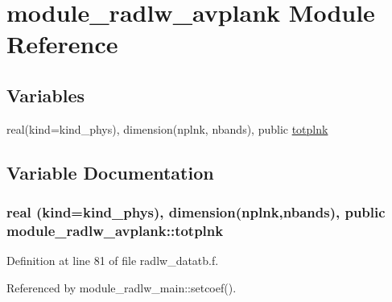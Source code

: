 \hypertarget{namespacemodule__radlw__avplank}{}\section{module\+\_\+radlw\+\_\+avplank Module Reference}
\label{namespacemodule__radlw__avplank}
\subsection*{Variables}
\begin{DoxyCompactItemize}
\item 
real(kind=kind\+\_\+phys), dimension(nplnk, nbands), public \hyperlink{namespacemodule__radlw__avplank_a40c3d6831ec6d7dbdb31254226c8f861}{totplnk}
\end{DoxyCompactItemize}


\subsection{Variable Documentation}
\subsubsection[{\texorpdfstring{totplnk}{totplnk}}]{\setlength{\rightskip}{0pt plus 5cm}real (kind=kind\+\_\+phys), dimension(nplnk,nbands), public module\+\_\+radlw\+\_\+avplank\+::totplnk}\hypertarget{namespacemodule__radlw__avplank_a40c3d6831ec6d7dbdb31254226c8f861}{}\label{namespacemodule__radlw__avplank_a40c3d6831ec6d7dbdb31254226c8f861}


Definition at line 81 of file radlw\+\_\+datatb.\+f.



Referenced by module\+\_\+radlw\+\_\+main\+::setcoef().

